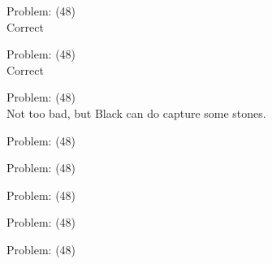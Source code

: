 \documentclass[11pt]{article}
\begin{document}
\begin{minipage}[t]{0.5\textwidth}
  {\centering
  
  Problem: (48)\\
  Correct\\
  }
\end{minipage}
\begin{minipage}[t]{0.5\textwidth}
  {\centering
  
  Problem: (48)\\
  Correct\\
  }
\end{minipage}
\begin{minipage}[t]{0.5\textwidth}
  {\centering
  
  Problem: (48)\\
  Not too bad, but Black can do capture some stones.\\
  }
\end{minipage}
\begin{minipage}[t]{0.5\textwidth}
  {\centering
  
  Problem: (48)\\
  
  }
\end{minipage}
\begin{minipage}[t]{0.5\textwidth}
  {\centering
  
  Problem: (48)\\
  
  }
\end{minipage}
\begin{minipage}[t]{0.5\textwidth}
  {\centering
  
  Problem: (48)\\
  
  }
\end{minipage}
\begin{minipage}[t]{0.5\textwidth}
  {\centering
  
  Problem: (48)\\
  
  }
\end{minipage}
\begin{minipage}[t]{0.5\textwidth}
  {\centering
  
  Problem: (48)\\
  
  }
\end{minipage}
\end{document}
